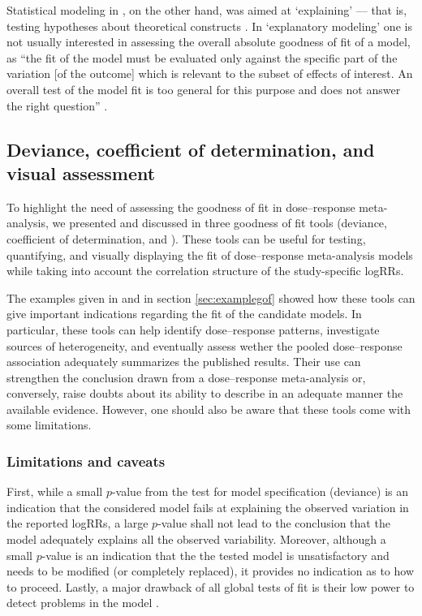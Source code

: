 Statistical modeling in , on the other hand, was aimed at `explaining' --- that is, testing hypotheses about theoretical constructs \citep{shmueli_explain_2010}. In `explanatory modeling' one is not usually interested in assessing the overall absolute goodness of fit of a model, as ``the fit of the model must be evaluated only against the specific part of the variation [of the outcome] which is relevant to the subset of effects of interest. An overall test of the model fit is too general for this purpose and does not answer the right question'' \citep{hagquist_goodness_1998}.


\subsection{Deviance, coefficient of determination, and visual assessment}

To highlight the need of assessing the goodness of fit in dose--response meta-analysis, we presented and discussed in  three goodness of fit tools (deviance, coefficient of determination, and \rveplot). These tools can be useful for testing, quantifying, and visually displaying the fit of dose--response meta-analysis models while taking into account the correlation structure of the study-specific logRRs. 

The examples given in  and in section \ref{sec:examplegof} showed how these tools can give important indications regarding the fit of the candidate models. In particular, these tools can help identify dose--response patterns, investigate sources of heterogeneity, and eventually assess wether the pooled dose--response association adequately summarizes the published results. Their use can strengthen the conclusion drawn from a dose--response meta-analysis or, conversely, raise doubts about its ability to describe in an adequate manner the available evidence. However, one should also be aware that these tools come with some  limitations.%


\subsubsection{Limitations and caveats}

First, while a small $p$-value from the test for model specification (deviance) is an indication that the considered model fails at explaining the observed variation in the reported logRRs, a large $p$-value shall not lead to the conclusion that the model adequately explains all the observed variability. Moreover, although a small $p$-value is an indication that the the tested model is unsatisfactory and needs to be modified (or completely replaced), it provides no indication as to how to proceed. Lastly, a major drawback of all global tests of fit is their low power to detect problems in the model \citep{hosmer_comparison_1997}.

